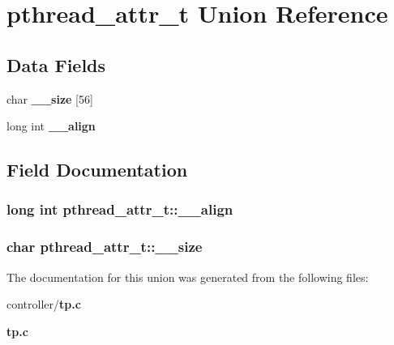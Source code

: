 \section{pthread\_\-attr\_\-t Union Reference}
\label{unionpthread__attr__t}
\subsection*{Data Fields}
\begin{DoxyCompactItemize}
\item 
char {\bf \_\-\_\-size} [56]
\item 
long int {\bf \_\-\_\-align}
\end{DoxyCompactItemize}


\subsection{Field Documentation}
\subsubsection[{\_\-\_\-align}]{\setlength{\rightskip}{0pt plus 5cm}long int {\bf pthread\_\-attr\_\-t::\_\-\_\-align}}\label{unionpthread__attr__t_a95e7355fcfcc161aabfb6b5d8f4e19cd}
\subsubsection[{\_\-\_\-size}]{\setlength{\rightskip}{0pt plus 5cm}char {\bf pthread\_\-attr\_\-t::\_\-\_\-size}}\label{unionpthread__attr__t_a7548e14eb53b54bdd4fab49a97076b16}


The documentation for this union was generated from the following files:\begin{DoxyCompactItemize}
\item 
controller/{\bf tp.c}\item 
{\bf tp.c}\end{DoxyCompactItemize}
